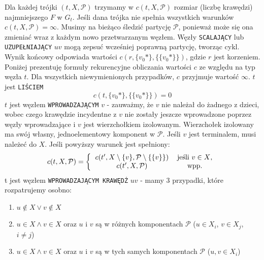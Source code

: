 \documentclass[12pt, oneside]{report}
\begin{document}
Dla każdej trójki $(t, X, \mathcal{P})$ trzymamy w $c(t, X, \mathcal{P})$ rozmiar (liczbę krawędzi) najmniejszego $F$ w $G_t$. Jeśli dana trójka nie spełnia wszystkich warunków $c(t, X, \mathcal{P}) = \infty$. Musimy na bieżąco śledzić partycję $\mathcal{P}$, ponieważ może się ona zmieniać wraz z każdym nowo przetwarzanym węzłem. Węzły \texttt{SCALAJĄCY} lub \texttt{UZUPEŁNIAJĄCY} $uv$ mogą zepsuć wcześniej poprawną partycję, tworząc cykl. Wynik końcowy odpowiada wartości $c(r, \{v_0*\}, \{\{v_0*\}\})$, gdzie $r$ jest korzeniem. Poniżej prezentuję formuły rekurencyjne obliczania wartości $c$ ze względu na typ węzła $t$. Dla wszystkich niewymienionych przypadków, $c$ przyjmuje wartość $\infty$.
\newline\newline
$t$ jest \texttt{LIŚCIEM}
$$c(t, \{v_0*\}, \{\{v_0*\}\}) = 0$$
\newline
$t$ jest węzłem \texttt{WPROWADZAJĄCYM} $v$ - zauważmy, że $v$ nie należał do żadnego z dzieci, wobec czego krawędzie incydentne z $v$ nie zostały jeszcze wprowadzone poprzez węzły wprowadzające i $v$ jest wierzchołkiem izolowanym. Wierzchołek izolowany ma swój własny, jednoelementowy komponent w $\mathcal{P}$. Jeśli $v$ jest terminalem, musi należeć do $X$. Jeśli powyższy warunek jest spełniony: 
\[
c(t, X, \mathcal{P}) =  
\left \{
  \begin{tabular}{ccc}
  $c(t', X \setminus \{v\}, \mathcal{P} \setminus \{\{v\}\})$ & jeśli $v \in X$,\\
  $c(t', X, \mathcal{P})$ & wpp.
  \end{tabular}
\right. 
\]
\newline
t jest węzłem \texttt{WPROWADZAJĄCYM KRAWĘDŹ} $uv$ - mamy 3 przypadki, które rozpatrujemy osobno:

\begin{enumerate}
\item \label{notinx} $u \notin X \lor v \notin X$
\item \label{notinthesamecomponent} $u \in X \land v \in X$ oraz $u$ i $v$ są w różnych komponentach $\mathcal{P}$ ($u \in X_i$, $v \in X_j$, $i \neq j$)
\item \label{edgepossible} $u \in X \land v \in X$ oraz $u$ i $v$ są w tych samych komponentach $\mathcal{P}$ ($u,v \in X_i$)
\end{enumerate} 
\end{document}
